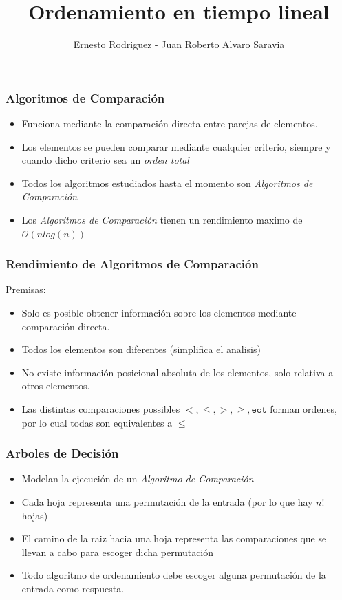 \documentclass{beamer}
\title[Tiempo Lineal]{Ordenamiento en tiempo lineal}
\author{Ernesto Rodriguez - Juan Roberto Alvaro Saravia}
\institute{
    Universidad Francisco Marroquin \\
    \medskip \textit{ernestorodriguez@ufm.edu - juanalvarado@ufm.edu}
}
\date[\today]{}
\begin{document}
\begin{frame}
\titlepage
\end{frame}


\begin{frame}
    \frametitle{Algoritmos de Comparaci\'on}
    \begin{itemize}
        \item{Funciona mediante la comparaci\'on directa
            entre parejas de elementos.}
        \item{Los elementos se pueden comparar mediante cualquier
            criterio, siempre y cuando dicho criterio sea un \emph{orden total}}
        \item{Todos los algoritmos estudiados hasta el momento son
            \emph{Algoritmos de Comparaci\'on}}
        \item{Los \emph{Algoritmos de Comparaci\'on} tienen un rendimiento
        maximo de $\mathcal{O}(nlog(n))$}

    \end{itemize}
\end{frame}

\begin{frame}
    \frametitle{Rendimiento de Algoritmos de Comparaci\'on}
    Premisas:
    \begin{itemize}
        \item{Solo es posible obtener informaci\'on sobre los elementos
        mediante comparaci\'on directa.}
        \item{Todos los elementos son diferentes (simplifica el analisis)}
        \item{No existe informaci\'on posicional absoluta de los elementos,
        solo relativa a otros elementos.}
        \item{Las distintas comparaciones possibles $<,\leq,>,\geq,\mathtt{ect}$ forman
        ordenes, por lo cual todas son equivalentes a $\leq$}
    \end{itemize}
\end{frame}

\begin{frame}
    \frametitle{Arboles de Decisi\'on}
    \begin{itemize}
        \item{Modelan la ejecuci\'on de un \emph{Algoritmo de Comparaci\'on}}
        \item{Cada hoja representa una permutaci\'on de
            la entrada (por lo que hay $n!$ hojas)}
        \item{El camino de la raiz hacia una hoja representa las comparaciones
        que se llevan a cabo para escoger dicha permutaci\'on}
        \item{Todo algoritmo de ordenamiento debe escoger alguna permutaci\'on
        de la entrada como respuesta.}
    \end{itemize}
\end{frame}
\end{document}
